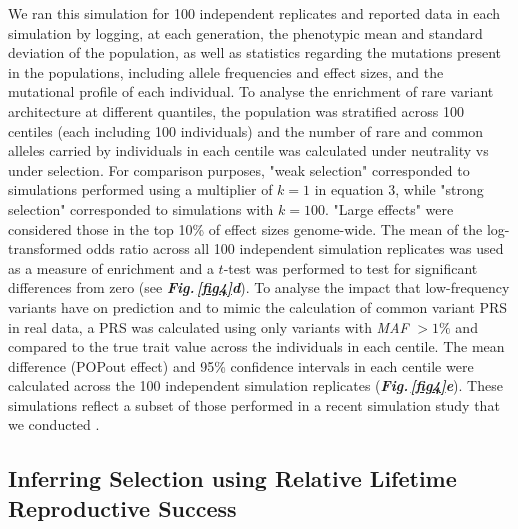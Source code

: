 \documentclass[12pt]{zHenriquesLab-StyleBioRxiv}
\newcommand\dref[2]{\normalsize{\textbf{\textit{Fig.\,\ref{#1}#2}}}\normalsize{}}
\begin{document}
{{We ran this simulation for 100 independent replicates and reported data in 
each simulation by logging, at each generation, the phenotypic mean and standard 
deviation of the population, as well as statistics regarding the mutations present in the 
populations, including allele frequencies and effect sizes, and the mutational profile of each individual. 
To analyse the enrichment of rare variant architecture at different quantiles, the population 
was stratified across 100 centiles (each including 100 individuals) and the number of rare and common 
alleles carried by individuals in each centile was calculated under neutrality vs under selection.  For comparison 
purposes, "weak selection" corresponded to simulations performed using a multiplier of $k=1$ in equation 3, 
while "strong selection" corresponded to simulations with $k=100$. "Large effects" were considered 
those in the top 10\% of effect sizes genome-wide.   The mean of the log-transformed odds ratio across 
all 100 independent simulation replicates was used as a measure of enrichment and a $t$-test was 
performed to test for significant differences from zero (see \dref{fig4}{d}).  To analyse the impact 
that low-frequency variants have on prediction and to mimic the calculation of common 
variant PRS in real data, a PRS was calculated using only variants with \emph{MAF} $>1\%$ 
and compared to the true trait value across the individuals in each centile.  The mean difference (POPout effect) 
and 95\% confidence intervals in each centile were calculated across the 100 independent simulation 
replicates (\dref{fig4}{e}). These simulations reflect a subset of those performed in a recent simulation study 
that we conducted \cite{Ori2024}.


























\subsection*{Inferring Selection using Relative Lifetime Reproductive Success}

}}
\end{document}
